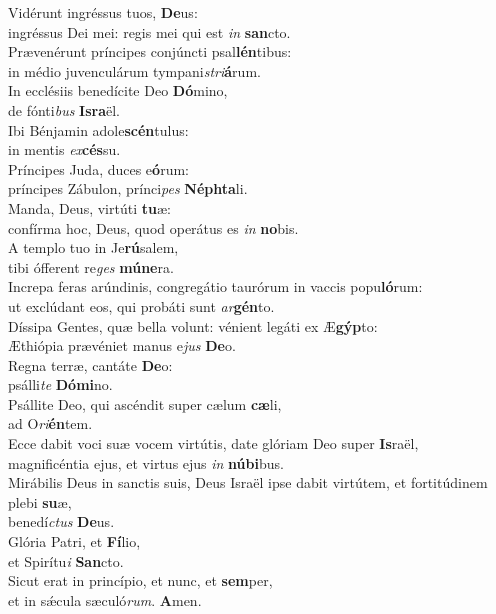 \evenverse Vidérunt ingréssus tuos, \textbf{De}us:~\*\\
\evenverse ingréssus Dei mei: regis mei qui est \textit{in} \textbf{san}cto.\\
\oddverse Prævenérunt príncipes conjúncti psal\textbf{lén}tibus:~\*\\
\oddverse in médio juvenculárum tympani\textit{stri}\textbf{á}rum.\\
\evenverse In ecclésiis benedícite Deo \textbf{Dó}mino,~\*\\
\evenverse de fónti\textit{bus} \textbf{Is}\textbf{ra}ël.\\
\oddverse Ibi Bénjamin adole\textbf{scén}tulus:~\*\\
\oddverse in mentis \textit{ex}\textbf{cés}su.\\
\evenverse Príncipes Juda, duces e\textbf{ó}rum:~\*\\
\evenverse príncipes Zábulon, prínci\textit{pes} \textbf{Né}\textbf{phta}li.\\
\oddverse Manda, Deus, virtúti \textbf{tu}æ:~\*\\
\oddverse confírma hoc, Deus, quod operátus es \textit{in} \textbf{no}bis.\\
\evenverse A templo tuo in Je\textbf{rú}salem,~\*\\
\evenverse tibi ófferent re\textit{ges} \textbf{mú}\textbf{ne}ra.\\
\oddverse Increpa feras arúndinis, congregátio taurórum in vaccis popu\textbf{ló}rum:~\*\\
\oddverse ut exclúdant eos, qui probáti sunt \textit{ar}\textbf{gén}to.\\
\evenverse Díssipa Gentes, quæ bella volunt: vénient legáti ex Æ\textbf{gýp}to:~\*\\
\evenverse Æthiópia prævéniet manus e\textit{jus} \textbf{De}o.\\
\oddverse Regna terræ, cantáte \textbf{De}o:~\*\\
\oddverse psálli\textit{te} \textbf{Dó}\textbf{mi}no.\\
\evenverse Psállite Deo, qui ascéndit super cælum \textbf{cæ}li,~\*\\
\evenverse ad O\textit{ri}\textbf{én}tem.\\
\oddverse Ecce dabit voci suæ vocem virtútis, date glóriam Deo super \textbf{Is}raël,~\*\\
\oddverse magnificéntia ejus, et virtus ejus \textit{in} \textbf{nú}\textbf{bi}bus.\\
\evenverse Mirábilis Deus in sanctis suis, Deus Israël ipse dabit virtútem, et fortitúdinem plebi \textbf{su}æ,~\*\\
\evenverse benedí\textit{ctus} \textbf{De}us.\\
\oddverse Glória Patri, et \textbf{Fí}lio,~\*\\
\oddverse et Spirítu\textit{i} \textbf{San}cto.\\
\evenverse Sicut erat in princípio, et nunc, et \textbf{sem}per,~\*\\
\evenverse et in sǽcula sæculó\textit{rum}. \textbf{A}men.\\
